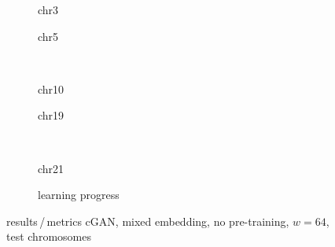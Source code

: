 \begin{figure}[p] %
    \begin{subfigure}{0.45\textwidth}
        \scriptsize
        \caption{chr3}
    \end{subfigure} \hfill
    \begin{subfigure}{0.45\textwidth}
        \scriptsize
        \caption{chr5}
    \end{subfigure}\\[5mm]
    \begin{subfigure}{0.45\textwidth}
        \scriptsize
        \caption{chr10}
    \end{subfigure}\hfill
    \begin{subfigure}{0.45\textwidth}
        \scriptsize
        \caption{chr19}
    \end{subfigure}\\[3mm]
    \centering
    \begin{subfigure}{0.45\textwidth}
        \scriptsize
        \caption{chr21}
    \end{subfigure} \hfill
    \begin{subfigure}{0.45\textwidth}
        \scriptsize
        \caption{learning progress} \label{fig:results:GAN64_mixed_lossEpochs}
    \end{subfigure}
    \caption{results\,/\,metrics cGAN, mixed embedding, no pre-training, $w=64$, test chromosomes}   \label{fig:results:GAN64_mixed_pearson}
\end{figure}
